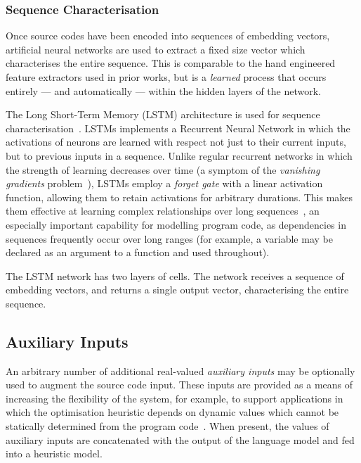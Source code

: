 \subsubsection{Sequence Characterisation}

Once source codes have been encoded into sequences of embedding vectors, artificial neural networks are used to extract a fixed size vector which characterises the entire sequence. This is comparable to the hand engineered feature extractors used in prior works, but is a \emph{learned} process that occurs entirely --- and automatically --- within the hidden layers of the network.

The Long Short-Term Memory (LSTM) architecture is used for sequence characterisation~\cite{Hochreiter1997}. LSTMs implements a Recurrent Neural Network in which the activations of neurons are learned with respect not just to their current inputs, but to previous inputs in a sequence. Unlike regular recurrent networks in which the strength of learning decreases over time (a symptom of the \emph{vanishing gradients} problem~\cite{Pacanu2013}), LSTMs employ a \emph{forget gate} with a linear activation function, allowing them to retain activations for arbitrary durations. This makes them effective at learning complex relationships over long sequences~\cite{Lipton2015}, an especially important capability for modelling program code, as dependencies in sequences frequently occur over long ranges (for example, a variable may be declared as an argument to a function and used throughout).

The LSTM network has two layers of cells. The network receives a sequence of embedding vectors, and returns a single output vector, characterising the entire sequence.


\subsection{Auxiliary Inputs}

An arbitrary number of additional real-valued \emph{auxiliary inputs} may be optionally used to augment the source code input. These inputs are provided as a means of increasing the flexibility of the system, for example, to support applications in which the optimisation heuristic depends on dynamic values which cannot be statically determined from the program code~\cite{Ding2015,Stephenson2005}. When present, the values of auxiliary inputs are concatenated with the output of the language model and fed into a heuristic model.


